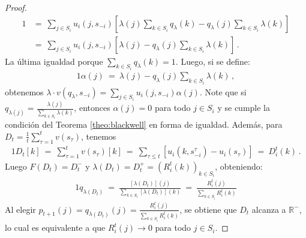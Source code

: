 \begin{proof}
\begin{alignat}{1}
	&=\ \sum_{j \in S_i} u_i(j, s_{-i}) \left[ \lambda(j) \sum_{k \in S_i} q_{\lambda}(k)  - q_{\lambda}(j) \sum_{k \in S_i} \lambda(k)  \right] \\
	&=\ \sum_{j \in S_i} u_i(j, s_{-i}) \left[ \lambda(j) - q_{\lambda}(j) \sum_{k \in S_i} \lambda(k) \right] \,.
\end{alignat}
La última igualdad porque $\sum_{k\in S_i} q_{\lambda}(k)=1$. Luego, si se define:
\begin{alignat}{1}
	\alpha(j)\ =\ \lambda(j) - q_{\lambda}(j) \sum_{k \in S_i} \lambda(k) \,,
\end{alignat}
obtenemos $\lambda \cdot v(q_{\lambda}, s_{-i}) = \sum_{j \in S_i} u_i(j, s_{-i})\alpha(j)$.
Note que si $q_{\lambda(j)} = \frac{\lambda(j)}{\sum_{k \in S_i} \lambda(k)}$, entonces $\alpha(j) = 0$ para todo $j \in S_i$ y se cumple la condición del Teorema \ref{theo:blackwell} en forma de igualdad. Además, para $D_t=\frac{1}{t} \sum_{\tau = 1}^{t} v(s_{\tau})$, tenemos
\begin{alignat}{1}
	D_t[k]\ =\ \sum_{\tau = 1}^{t} v(s_{\tau})[k]\ =\ \sum_{\tau \leq t }[u_i(k, s_{-i}^{\tau}) - u_i(s_{\tau})]\ =\  D_i^t(k) \,.
\end{alignat}
Luego $F(D_t) = D_t^-$ y $\lambda(D_t) = D_t^+ = (R_i^t(k))_{k \in S_i}$, obteniendo:
\begin{alignat}{1}
	q_{\lambda(D_t)}\ =\ \frac{[\lambda(D_t)](j)}{\sum_{k \in S_i}[\lambda(D_t)](k)}\ =\ \frac{R_i^t(j)}{\sum_{k \in S_i} R_i^t(k)}
\end{alignat}
Al elegir $p_{t+1}(j) = q_{\lambda(D_t)}(j) = \frac{R_i^t (j)}{\sum_{k \in S_i} R_i^t(k)}$, se obtiene que $D_t$ alcanza a $\mathbb{R^-}$, lo cual es equivalente a que $R_i^t(j) \rightarrow 0$ para todo $j \in S_i$.
\end{proof}
